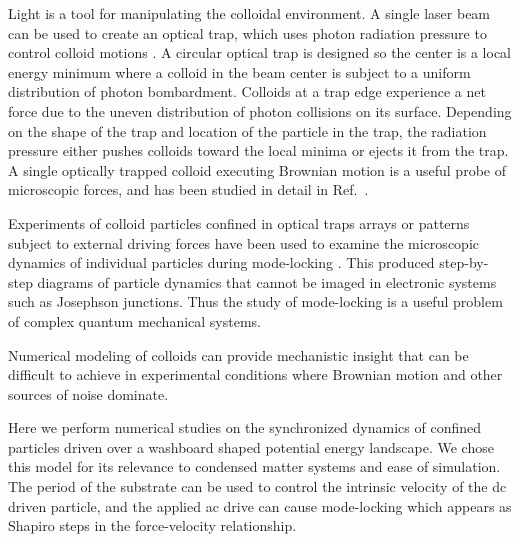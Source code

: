 \documentclass[twocolumn,preprintnumbers,amsmath,amssymb,aps,prx]{revtex4}
\begin{document}
Light is a
tool for manipulating the colloidal environment.
A single laser beam can be used to create an optical trap,
which uses 
photon radiation pressure to
control colloid motions \cite{Ashkin1997}.
A circular optical trap is designed so the center is
a local energy minimum where 
a colloid in the beam center is subject to a
uniform distribution of photon bombardment. %
Colloids at a trap edge
experience a net force
due to the uneven 
distribution of photon collisions on its surface.
Depending on the shape of the trap and location of the particle in the trap,
the radiation pressure either pushes colloids toward the local minima
or ejects it from the trap.
A single optically trapped colloid executing Brownian motion
is a useful probe of microscopic forces,
and has been studied in detail in Ref.~\cite{Volpe2013}.


Experiments of colloid particles confined
in optical traps arrays or patterns 
subject to external driving forces 
have
been used to examine the microscopic dynamics
of individual particles during mode-locking \cite{Juniper2015}.
This produced step-by-step diagrams
of particle dynamics that cannot be 
imaged in electronic systems such as Josephson junctions.
Thus the study of
mode-locking is a useful problem
of complex quantum mechanical systems.


Numerical modeling of colloids can provide mechanistic insight
that can be difficult to achieve in experimental conditions
where Brownian motion and other sources of noise dominate.

Here we perform numerical studies 
on the synchronized dynamics
of confined particles driven over
a washboard shaped potential energy landscape.
We chose this model for its
relevance to condensed matter systems
and ease of simulation.
The period of the substrate
can be used to control the
intrinsic velocity of the dc driven particle,
and the applied ac drive can cause mode-locking
which appears as
Shapiro steps in the force-velocity relationship.
\end{document}
